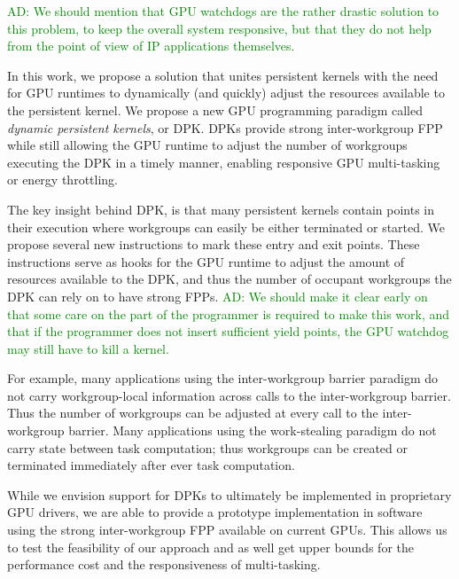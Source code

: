 \documentclass[nocopyrightspace,10pt]{sigplanconf}
\newcommand{\ADComment}[1]{\textcolor{green}{AD: #1}}
\begin{document}
\ADComment{We should mention that GPU watchdogs are the rather drastic solution to this problem, to keep the overall system responsive, but that they do not help from the point of view of IP applications themselves.}

In this work, we propose a solution that unites persistent kernels
with the need for GPU runtimes to dynamically (and quickly) adjust the
resources available to the persistent kernel. We propose a new GPU
programming paradigm called \emph{dynamic persistent kernels}, or
DPK. DPKs provide strong inter-workgroup FPP while still allowing the
GPU runtime to adjust the number of workgroups executing the DPK in a
timely manner, enabling responsive GPU multi-tasking or energy
throttling.

The key insight behind DPK, is that many persistent kernels contain
points in their execution where workgroups can easily be either
terminated or started. We propose several new instructions to mark
these entry and exit points. These instructions serve as hooks for the
GPU runtime to adjust the amount of resources available to the DPK,
and thus the number of occupant workgroups the DPK can rely on to have
strong FPPs. \ADComment{We should make it clear early on that some care on the part of the programmer is required to make this work, and that if the programmer does not insert sufficient yield points, the GPU watchdog may still have to kill a kernel.}

For example, many applications using the inter-workgroup barrier
paradigm do not carry workgroup-local information across calls to the
inter-workgroup barrier. Thus the number of workgroups can be adjusted
at every call to the inter-workgroup barrier. Many applications using
the work-stealing paradigm do not carry state between task
computation; thus workgroups can be created or terminated immediately
after ever task computation.

While we envision support for DPKs to ultimately be implemented in
proprietary GPU drivers, we are able to provide a prototype
implementation in software using the strong inter-workgroup FPP
available on current GPUs. This allows us to test the feasibility of
our approach and as well get upper bounds for the performance cost and
the responsiveness of multi-tasking.
\end{document}
